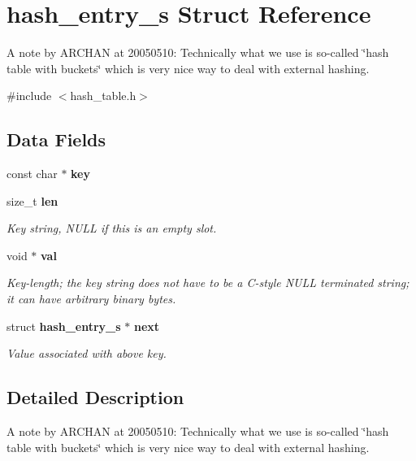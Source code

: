 \section{hash\-\_\-entry\-\_\-s Struct Reference}
\label{structhash__entry__s}


A note by A\-R\-C\-H\-A\-N at 20050510\-: Technically what we use is so-\/called \char`\"{}hash table with buckets\char`\"{} which is very nice way to deal with external hashing.  




{\ttfamily \#include $<$hash\-\_\-table.\-h$>$}

\subsection*{Data Fields}
\begin{DoxyCompactItemize}
\item 
const char $\ast$ {\bfseries key}\label{structhash__entry__s_a2566ac1233761789585363a283385321}

\item 
size\-\_\-t {\bf len}
\begin{DoxyCompactList}\small\item\em Key string, N\-U\-L\-L if this is an empty slot. \end{DoxyCompactList}\item 
void $\ast$ {\bf val}\label{structhash__entry__s_a0d57012963084fed93886681108aa636}

\begin{DoxyCompactList}\small\item\em Key-\/length; the key string does not have to be a C-\/style N\-U\-L\-L terminated string; it can have arbitrary binary bytes. \end{DoxyCompactList}\item 
struct {\bf hash\-\_\-entry\-\_\-s} $\ast$ {\bf next}\label{structhash__entry__s_aa855ac854b9c36cf23f60d9ac8093e7f}

\begin{DoxyCompactList}\small\item\em Value associated with above key. \end{DoxyCompactList}\end{DoxyCompactItemize}


\subsection{Detailed Description}
A note by A\-R\-C\-H\-A\-N at 20050510\-: Technically what we use is so-\/called \char`\"{}hash table with buckets\char`\"{} which is very nice way to deal with external hashing. 

